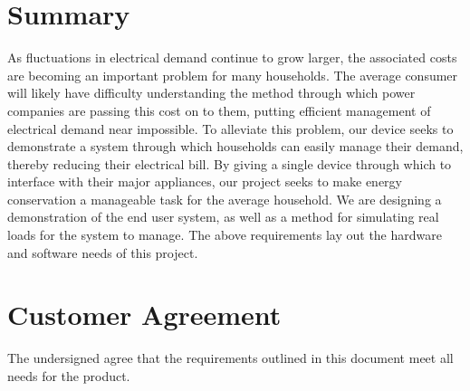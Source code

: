 \documentclass[12pt,letterpaper]{article}
\begin{document}
\section{Summary}

As fluctuations in electrical demand continue to grow larger, the associated
costs are becoming an important problem for many households. The average consumer will likely have
difficulty understanding the method through which power companies are passing
this cost on to them, putting efficient management of electrical demand near
impossible. To alleviate this problem, our device seeks to demonstrate a system
through which households can easily manage their demand, thereby reducing their
electrical bill. By giving a single device through which to interface with their
major appliances, our project seeks to make energy conservation a manageable
task for the average household. We are designing a demonstration of the end user
system, as well as a method for simulating real loads for the system to manage.
The above requirements lay out the hardware and software needs of this project.


\clearpage
\section{Customer Agreement}


The undersigned agree that the requirements outlined in this document meet all needs for the product.


\end{document}
